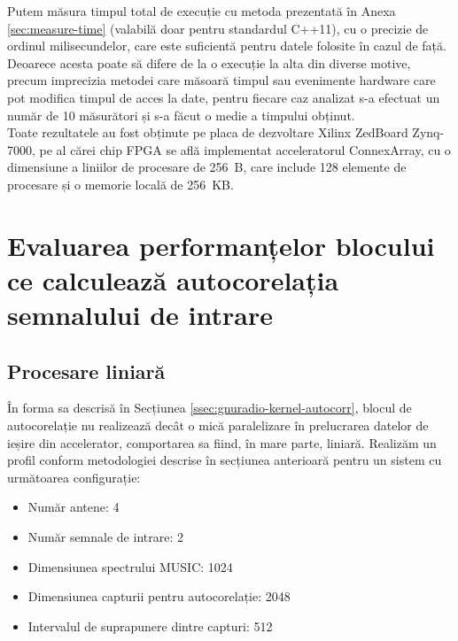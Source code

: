 Putem măsura timpul total de execuție cu metoda prezentată în Anexa
\ref{sec:measure-time} (valabilă doar pentru standardul C++11), cu o precizie de
ordinul milisecundelor, care este suficientă pentru datele folosite în cazul de
față. Deoarece acesta poate să difere de la o execuție la alta din diverse
motive, precum imprecizia metodei care măsoară timpul sau evenimente hardware
care pot modifica timpul de acces la date, pentru fiecare caz analizat s-a
efectuat un număr de 10 măsurători și s-a făcut o medie a timpului obținut. \\

Toate rezultatele au fost obținute pe placa de dezvoltare Xilinx ZedBoard
Zynq-7000, pe al cărei chip FPGA se află implementat acceleratorul ConnexArray,
cu o dimensiune a liniilor de procesare de \SI{256}{B}, care include 128
elemente de procesare și o memorie locală de \SI{256}{KB}.


\section{Evaluarea performanțelor blocului ce calculează autocorelația
semnalului de intrare}
\label{sec:eval-autocorr}

\subsection{Procesare liniară}

În forma sa descrisă în Secțiunea \ref{ssec:gnuradio-kernel-autocorr}, blocul de
autocorelație nu realizează decât o mică paralelizare în prelucrarea datelor de
ieșire din accelerator, comportarea sa fiind, în mare parte, liniară. Realizăm
un profil conform metodologiei descrise în secțiunea anterioară pentru un sistem
cu următoarea configurație:
\begin{itemize}
  \item Număr antene: 4
  \item Număr semnale de intrare: 2
  \item Dimensiunea spectrului MUSIC: 1024
  \item Dimensiunea capturii pentru autocorelație: 2048
  \item Intervalul de suprapunere dintre capturi: 512
\end{itemize}

